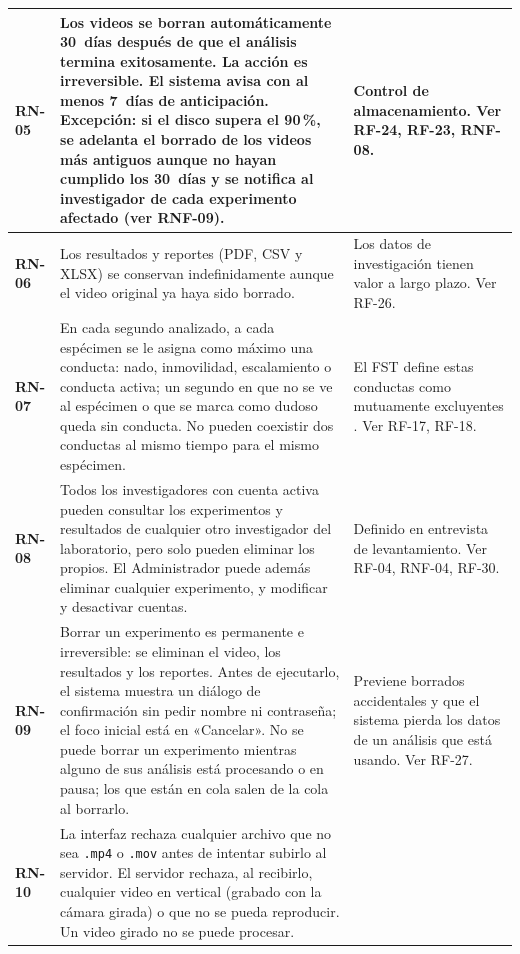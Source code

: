 \begin{longtable}{|>{\bfseries}p{1.1cm}|>{\raggedright}p{8.1cm}|>{\raggedright\arraybackslash}p{3.9cm}|}
\hline
RN-05 & Los videos se borran automáticamente 30~días después de que el análisis
        termina exitosamente. La acción es irreversible. El sistema avisa con al
        menos 7~días de anticipación. Excepción: si el disco supera el 90\,\%, se
        adelanta el borrado de los videos más antiguos aunque no hayan cumplido
        los 30~días y se notifica al investigador de cada experimento afectado
        (ver RNF-09).
      & Control de almacenamiento. Ver RF-24, RF-23, RNF-08. \\
\hline
RN-06 & Los resultados y reportes (PDF, CSV y XLSX) se conservan indefinidamente aunque
        el video original ya haya sido borrado.
      & Los datos de investigación tienen valor a largo plazo. Ver RF-26. \\
\hline
RN-07 & En cada segundo analizado, a cada espécimen se le asigna como máximo una
        conducta: nado, inmovilidad, escalamiento o conducta activa; un segundo
        en que no se ve al espécimen o que se marca como dudoso queda sin conducta. No
        pueden coexistir dos conductas al mismo tiempo para el mismo espécimen.
      & El FST define estas conductas como mutuamente excluyentes
        \cite{armario2021}. Ver RF-17, RF-18. \\
\hline
RN-08 & Todos los investigadores con cuenta activa pueden consultar los experimentos
        y resultados de cualquier otro investigador del laboratorio, pero solo pueden
        eliminar los propios. El Administrador puede además eliminar cualquier
        experimento, y modificar y desactivar cuentas.
      & Definido en entrevista de levantamiento. Ver RF-04, RNF-04, RF-30. \\
\hline
RN-09 & Borrar un experimento es permanente e irreversible: se eliminan el video,
        los resultados y los reportes. Antes de ejecutarlo, el sistema muestra un diálogo de confirmación
        sin pedir nombre ni contraseña; el foco inicial está en «Cancelar». No se puede borrar
        un experimento mientras alguno de sus análisis está procesando o en pausa;
        los que están en cola salen de la cola al borrarlo.
      & Previene borrados accidentales y que el sistema pierda los datos de un
        análisis que está usando. Ver RF-27. \\
\hline
RN-10 & La interfaz rechaza cualquier archivo que no sea \texttt{.mp4} o
        \texttt{.mov} antes de intentar subirlo al servidor. El servidor rechaza, al
        recibirlo, cualquier video en vertical (grabado con la cámara girada) o que no
        se pueda reproducir. Un video girado no se puede procesar.

\end{longtable}
